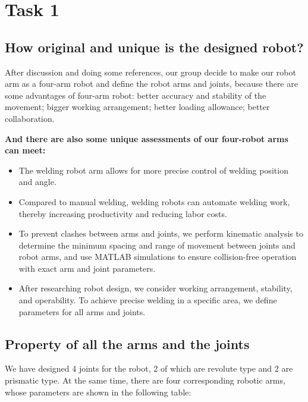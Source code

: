 \section{Task 1}
\FloatBarrier %


\subsection{How original and unique is the designed robot?}

After discussion and doing some references, our group decide to make our robot arm as a four-arm robot and define the robot arms and joints, because there are some advantages of four-arm robot: better accuracy and stability of the movement; bigger working arrangement; better loading allowance; better collaboration.

\textbf{And there are also some unique assessments of our four-robot arms can meet:}
\begin{itemize}
    \item The welding robot arm allows for more precise control of welding position and angle.
    \item Compared to manual welding, welding robots can automate welding work, thereby increasing productivity and reducing labor costs.
    \item To prevent clashes between arms and joints, we perform kinematic analysis to determine the minimum spacing and range of movement between joints and robot arms, and use MATLAB simulations to ensure collision-free operation with exact arm and joint parameters.
    \item After researching robot design, we consider working arrangement, stability, and operability. To achieve precise welding in a specific area, we define parameters for all arms and joints.
\end{itemize}

\subsection{Property of all the arms and the joints}

We have designed 4 joints for the robot, 2 of which are revolute type and 2 are prismatic type. At the same time, there are four corresponding robotic arms, whose parameters are shown in the following table:

